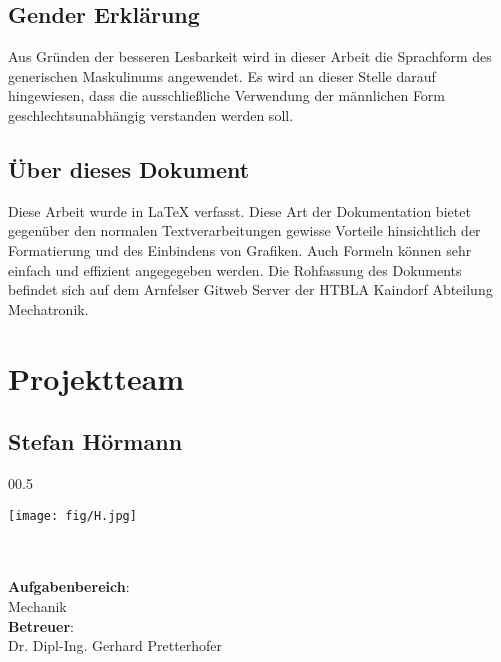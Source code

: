 \newpage
\thispagestyle{empty}
\mbox{}

\clearpage

\subsection*{Gender Erklärung}
\label{sec:gender-erklaerung}
Aus Gründen der besseren Lesbarkeit wird in dieser Arbeit die Sprachform des generischen Maskulinums angewendet. Es wird an dieser Stelle darauf hingewiesen, dass die ausschließliche Verwendung der männlichen Form geschlechtsunabhängig verstanden werden soll.

\subsection*{Über dieses Dokument}
\label{sec:ueber-dokument}
Diese Arbeit wurde in \LaTeX{} verfasst. Diese Art der Dokumentation bietet gegenüber den normalen Textverarbeitungen gewisse Vorteile hinsichtlich der Formatierung und des Einbindens von Grafiken. Auch Formeln können sehr einfach und effizient angegegeben werden. Die Rohfassung des Dokuments befindet sich auf dem Arnfelser Gitweb Server der HTBLA Kaindorf Abteilung Mechatronik.

\clearpage

\newpage
\thispagestyle{empty}
\mbox{}

\clearpage

\section*{Projektteam}
\label{sec:projektteam}

\subsection*{Stefan Hörmann}
\begin{wrapfigure}[10]{0}{0.5\textwidth}
\begin{center}
  \vspace{-20mm}
  \texttt{[image: fig/H.jpg]}
\end{center}
\end{wrapfigure}
\mbox{}\\
\mbox{}\\
\textbf{Aufgabenbereich}:\\
Mechanik\\
\textbf{Betreuer}:\\
Dr. Dipl-Ing. Gerhard Pretterhofer
\mbox{}\\
\mbox{}\\
\mbox{}\\
